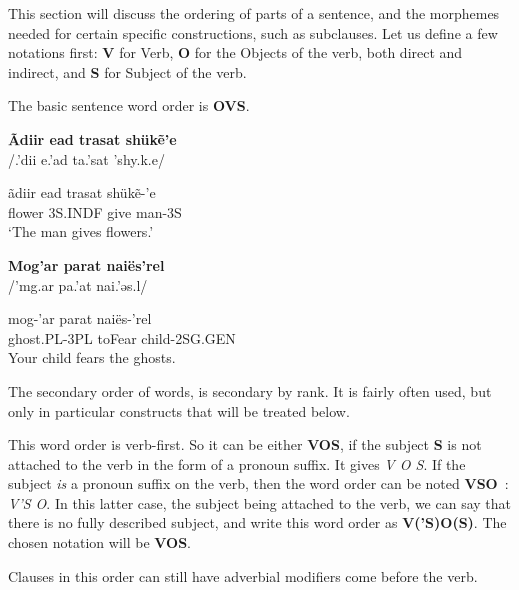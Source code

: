This section will discuss the ordering of parts of a sentence, and the morphemes needed for certain specific constructions, such as subclauses. Let us define a few notations first: \textbf{V} for Verb, \textbf{O} for the Objects of the verb, both direct and indirect, and \textbf{S} for Subject of the verb.

The basic sentence word order is \textbf{OVS}.

\begin{exe}
\ex\label{ex:syntax-primary-flower}
\textbf{Ãdiir ead trasat shükẽ’e}\\
/{\ipaAT}.'dii{\ipaR} e.'ad t{\ipaR}a.'sat 'shy.k{\ipaET}.e/

\gll ãdiir ead trasat shükẽ-’e\\
flower 3S.INDF give man-3S\\
\trans ‘The man gives flowers.’

\ex\label{ex:syntax-primary-ghost}
\textbf{Mog’ar parat naiës’rel}\\
/'m{\ipaO}g.ar pa.'{\ipaR}at nai.'əs.{\ipaR\ipaE}l/

\gll mog-’ar parat naiës-’rel\\
ghost.PL-3PL toFear child-2SG.GEN\\
\trans Your child fears the ghosts.
\end{exe}

The secondary order of words, is secondary by rank. It is fairly often used, but only in particular constructs that will be treated below.

This word order is verb-first. So it can be either \textbf{VOS}, if the subject \textbf{S} is not attached to the verb in the form of a pronoun suffix. It gives \emph{V O S}.
If the subject \emph{is} a pronoun suffix on the verb, then the word order can be noted \textbf{VSO} : \emph{V’S O}.
In this latter case, the subject being attached to the verb, we can say that there is no fully described subject, and write this word order as \textbf{V(’S)O(S)}.
The chosen notation will be \textbf{VOS}.

Clauses in this order can still have adverbial modifiers come before the verb.

